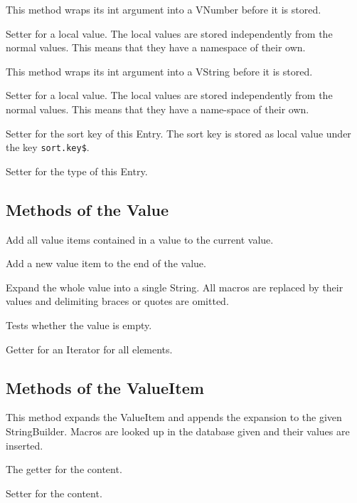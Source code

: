\begin{methods}
    This method wraps its int argument into a VNumber before it is stored.

     Setter for a local value. The local values are stored independently from
     the normal values. This means that they have a namespace of their own.

     This method wraps its int argument into a VString before it is stored.

    Setter for a local value. The local values are stored independently
    from the normal values. This means that they have a name-space of
    their own.

    Setter for the sort key of this Entry. The sort key is stored as
    local value under the key \texttt{sort.key\$}.

    Setter for the type of this Entry.

\end{methods}

\subsection{Methods of the Value}

\begin{methods}
    Add all value items contained in a value to the current value.

    Add a new value item to the end of the value.

    Expand the whole value into a single String. All macros are replaced by
    their values and delimiting braces or quotes are omitted.

    Tests whether the value is empty.

    Getter for an Iterator for all elements.

\end{methods}


\subsection{Methods of the ValueItem}

\begin{methods}

    This method expands the ValueItem and appends the expansion to the given
    StringBuilder. Macros are looked up in the database given and their
    values are inserted.

    The getter for the content.

    Setter for the content.

\end{methods}



\endinput%
%
